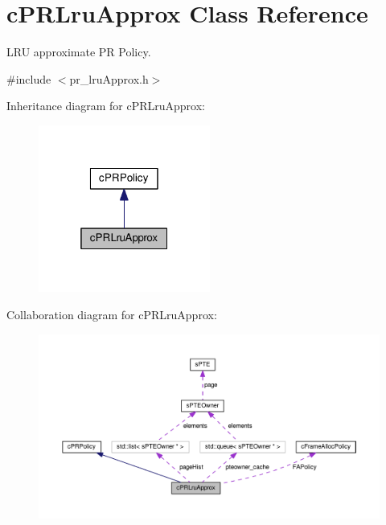\hypertarget{classcPRLruApprox}{\section{c\-P\-R\-Lru\-Approx \-Class \-Reference}
\label{d1/d58/classcPRLruApprox}
}


\-L\-R\-U approximate \-P\-R \-Policy.  




{\ttfamily \#include $<$pr\-\_\-lru\-Approx.\-h$>$}



\-Inheritance diagram for c\-P\-R\-Lru\-Approx\-:\nopagebreak
\begin{figure}[H]
\begin{center}
\leavevmode
\includegraphics[width=160pt]{d2/d0a/classcPRLruApprox__inherit__graph}
\end{center}
\end{figure}


\-Collaboration diagram for c\-P\-R\-Lru\-Approx\-:\nopagebreak
\begin{figure}[H]
\begin{center}
\leavevmode
\includegraphics[width=350pt]{d0/d7d/classcPRLruApprox__coll__graph}
\end{center}
\end{figure}
